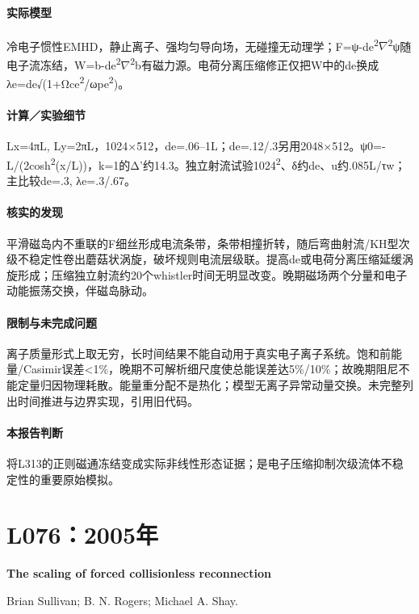 \documentclass[UTF8,a4paper,11pt,openany,fontset=fandol]{ctexbook}
\begin{document}
\paragraph{实际模型}冷电子惯性EMHD，静止离子、强均匀导向场，无碰撞无动理学；F=ψ-de\textsuperscript{2}\ensuremath{\nabla}\textsuperscript{2}ψ随电子流冻结，W=b-de\textsuperscript{2}\ensuremath{\nabla}\textsuperscript{2}b有磁力源。电荷分离压缩修正仅把W中的de换成λe=de√(1+Ωce\textsuperscript{2}/ωpe\textsuperscript{2})。

\paragraph{计算／实验细节}Lx=4πL, Ly=2πL，1024×512，de=.06–1L；de=.12/.3另用2048×512。ψ0=-L/(2cosh\textsuperscript{2}(x/L))，k=1的Δ'约14.3。独立射流试验1024\textsuperscript{2}、δ约de、u约.085L/τw；主比较de=.3, λe=.3/.67。

\paragraph{核实的发现}平滑磁岛内不重联的F细丝形成电流条带，条带相撞折转，随后弯曲射流/KH型次级不稳定性卷出蘑菇状涡旋，破坏规则电流层级联。提高de或电荷分离压缩延缓涡旋形成；压缩独立射流约20个whistler时间无明显改变。晚期磁场两个分量和电子动能振荡交换，伴磁岛脉动。

\paragraph{限制与未完成问题}离子质量形式上取无穷，长时间结果不能自动用于真实电子离子系统。饱和前能量/Casimir误差<1\%，晚期不可解析细尺度使总能误差达5\%/10\%；故晚期阻尼不能定量归因物理耗散。能量重分配不是热化；模型无离子异常动量交换。未完整列出时间推进与边界实现，引用旧代码。

\paragraph{本报告判断}将L313的正则磁通冻结变成实际非线性形态证据；是电子压缩抑制次级流体不稳定性的重要原始模拟。

\section{L076：2005年}\label{paper:L076}

\textbf{The scaling of forced collisionless reconnection}\citep{L076}\

Brian Sullivan;  B. N. Rogers;  Michael A. Shay.
\end{document}
